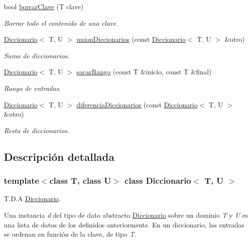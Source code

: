 \begin{DoxyCompactItemize}
bool \hyperlink{classDiccionario_ab4c7aabdad91cf517db259a371984cdf}{borrar\+Clave} (T clave)
\begin{DoxyCompactList}\small\item\em Borrar todo el contenido de una clave. \end{DoxyCompactList}\item 
\hyperlink{classDiccionario}{Diccionario}$<$ T, U $>$ \hyperlink{classDiccionario_afa915dec9a281340b8de575026131e7f}{union\+Diccionarios} (const \hyperlink{classDiccionario}{Diccionario}$<$ T, U $>$ \&otro)
\begin{DoxyCompactList}\small\item\em Suma de diccionarios. \end{DoxyCompactList}\item 
\hyperlink{classDiccionario}{Diccionario}$<$ T, U $>$ \hyperlink{classDiccionario_a13c55d999b1bcc0a0319659f5bc5dba4}{sacar\+Rango} (const T \&inicio, const T \&final)
\begin{DoxyCompactList}\small\item\em Rango de entradas. \end{DoxyCompactList}\item 
\hyperlink{classDiccionario}{Diccionario}$<$ T, U $>$ \hyperlink{classDiccionario_aeb9185c8e3f815b19c4f6b1811587787}{diferencia\+Diccionarios} (const \hyperlink{classDiccionario}{Diccionario}$<$ T, U $>$ \&otro)
\begin{DoxyCompactList}\small\item\em Resta de diccionarios. \end{DoxyCompactList}\end{DoxyCompactItemize}


\subsection{Descripción detallada}
\subsubsection*{template$<$class T, class U$>$\newline
class Diccionario$<$ T, U $>$}

T.\+D.\+A \hyperlink{classDiccionario}{Diccionario}. 

Una instancia {\itshape d} del tipo de dato abstracto \hyperlink{classDiccionario}{Diccionario} sobre un dominio {\itshape T} y {\itshape U} es una lista de datos de los definidos anteriormente. En un diccionario, las entradas se ordenan en función de la clave, de tipo {\itshape T}.

